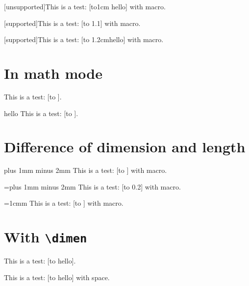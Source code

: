 \documentclass{revtex4-1}
\def\Supported{{\color{darkgreen} [supported]}}
\def\Unsupported{{\color{red} [unsupported]}}
\begin{document}
\def\A{o}
\Unsupported This is a test: [\hbox t\A 1cm {hello}] with macro. %

\def\A{.1}
\Supported This is a test: [\hbox to 1\A\textwidth {hello}] with macro. %

\def\A{m}
\Supported This is a test: [\hbox to 1.2c\A {hello}] with macro. %


\section{In math mode}
This is a test: [\hbox to ]. %


h\!e\!l\!l\!o
This is a test: [\hbox to ].



\section{Difference of dimension and length}

\newlength\myheight
\myheight=1cm plus 1mm minus 2mm %
This is a test: [\hbox to ] with macro. %

\textwidth=\textwidth plus 1mm minus 2mm %
This is a test: [\hbox to 0.2\textwidth {hello}] with macro. %

\myheight=1cmm %
This is a test: [\hbox to ] with macro. %


\section{With \texttt{\textbackslash dimen}}

This is a test: [\hbox to  {hello}]. %


This is a test: [\hbox to  {hello}] with space. %
\end{document}
